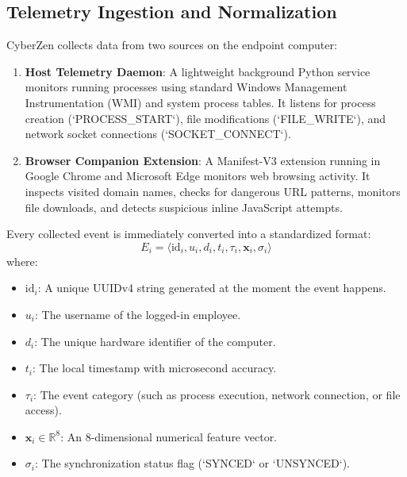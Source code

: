 \documentclass[conference]{IEEEtran}
\begin{document}
\subsection{Telemetry Ingestion and Normalization}
CyberZen collects data from two sources on the endpoint computer:
\begin{enumerate}
    \item \textbf{Host Telemetry Daemon}: A lightweight background Python service monitors running processes using standard Windows Management Instrumentation (WMI) and system process tables. It listens for process creation (`PROCESS_START`), file modifications (`FILE_WRITE`), and network socket connections (`SOCKET_CONNECT`).
    \item \textbf{Browser Companion Extension}: A Manifest-V3 extension running in Google Chrome and Microsoft Edge monitors web browsing activity. It inspects visited domain names, checks for dangerous URL patterns, monitors file downloads, and detects suspicious inline JavaScript attempts.
\end{enumerate}

Every collected event is immediately converted into a standardized format:
\begin{equation}
E_i = \langle \text{id}_i, u_i, d_i, t_i, \tau_i, \mathbf{x}_i, \sigma_i \rangle
\end{equation}
where:
\begin{itemize}
    \item $\text{id}_i$: A unique UUIDv4 string generated at the moment the event happens.
    \item $u_i$: The username of the logged-in employee.
    \item $d_i$: The unique hardware identifier of the computer.
    \item $t_i$: The local timestamp with microsecond accuracy.
    \item $\tau_i$: The event category (such as process execution, network connection, or file access).
    \item $\mathbf{x}_i \in \mathbb{R}^8$: An 8-dimensional numerical feature vector.
    \item $\sigma_i$: The synchronization status flag (`SYNCED` or `UNSYNCED`).
\end{itemize}
\end{document}
